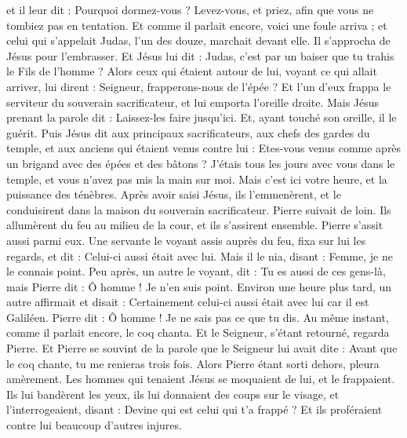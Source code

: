 \begin{multicols}{2}
et il leur dit : Pourquoi dormez-vous ? Levez-vous, et priez, afin que vous ne tombiez pas en tentation.
Et comme il parlait encore, voici une foule arriva ; et celui qui s'appelait Judas, l'un des douze, marchait devant elle. Il s'approcha de Jésus pour l'embrasser.
Et Jésus lui dit : Judas, c'est par un baiser que tu trahis le Fils de l'homme ?
Alors ceux qui étaient autour de lui, voyant ce qui allait arriver, lui dirent : Seigneur, frapperons-nous de l'épée ?
Et l'un d'eux frappa le serviteur du souverain sacrificateur, et lui emporta l'oreille droite.
Mais Jésus prenant la parole dit : Laissez-les faire jusqu'ici. Et, ayant touché son oreille, il le guérit.
Puis Jésus dit aux principaux sacrificateurs, aux chefs des gardes du temple, et aux anciens qui étaient venus contre lui : Etes-vous venus comme après un brigand avec des épées et des bâtons ?
J'étais tous les jours avec vous dans le temple, et vous n'avez pas mis la main sur moi. Mais c'est ici votre heure, et la puissance des ténèbres.
Après avoir saisi Jésus, ils l'emmenèrent, et le conduisirent dans la maison du souverain sacrificateur. Pierre suivait de loin.
Ils allumèrent du feu au milieu de la cour, et ils s'assirent ensemble. Pierre s'assit aussi parmi eux.
Une servante le voyant assis auprès du feu, fixa sur lui les regards, et dit : Celui-ci aussi était avec lui.
Mais il le nia, disant : Femme, je ne le connais point.
Peu après, un autre le voyant, dit : Tu es aussi de ces gens-là, mais Pierre dit : Ô homme ! Je n'en suis point.
Environ une heure plus tard, un autre affirmait et disait : Certainement celui-ci aussi était avec lui car il est Galiléen.
Pierre dit : Ô homme ! Je ne sais pas ce que tu dis. Au même instant, comme il parlait encore, le coq chanta.
Et le Seigneur, s'étant retourné, regarda Pierre. Et Pierre se souvint de la parole que le Seigneur lui avait dite : Avant que le coq chante, tu me renieras trois fois.
Alors Pierre étant sorti dehors, pleura amèrement.
Les hommes qui tenaient Jésus se moquaient de lui, et le frappaient.
Ils lui bandèrent les yeux, ils lui donnaient des coups sur le visage, et l'interrogeaient, disant : Devine qui est celui qui t'a frappé ?
Et ils proféraient contre lui beaucoup d'autres injures.

\end{multicols}
